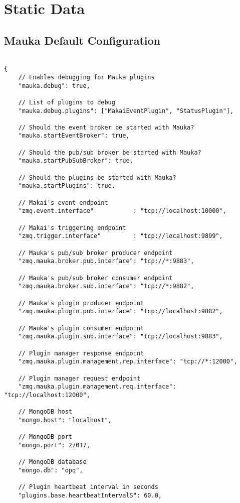 \appendix
\section{Static Data}

\subsection{Mauka Default Configuration}
\label{appendix:MaukaConfig}
\begin{verbatim}

{
	// Enables debugging for Mauka plugins
	"mauka.debug": true,
	
	// List of plugins to debug
	"mauka.debug.plugins": ["MakaiEventPlugin", "StatusPlugin"],
	
	// Should the event broker be started with Mauka?
	"mauka.startEventBroker": true,
	
	// Should the pub/sub broker be started with Mauka?
	"mauka.startPubSubBroker": true,
	
	// Should the plugins be started with Mauka?
	"mauka.startPlugins": true,
	
	// Makai's event endpoint
	"zmq.event.interface"           : "tcp://localhost:10000",
	
	// Makai's triggering endpoint
	"zmq.trigger.interface"         : "tcp://localhost:9899",
	
	// Mauka's pub/sub broker producer endpoint
	"zmq.mauka.broker.pub.interface": "tcp://*:9883",
	
	// Mauka's pub/sub broker consumer endpoint
	"zmq.mauka.broker.sub.interface": "tcp://*:9882",
	
	// Mauka's plugin producer endpoint
	"zmq.mauka.plugin.pub.interface": "tcp://localhost:9882",
	
	// Mauka's plugin consumer endpoint
	"zmq.mauka.plugin.sub.interface": "tcp://localhost:9883",
	
	// Plugin manager response endpoint
	"zmq.mauka.plugin.management.rep.interface": "tcp://*:12000",
	
	// Plugin manager request endpoint
	"zmq.mauka.plugin.management.req.interface": "tcp://localhost:12000",
	
	// MongoDB host
	"mongo.host": "localhost",
	
	// MongoDB port
	"mongo.port": 27017,
	
	// MongoDB database
	"mongo.db": "opq",
	
	// Plugin heartbeat interval in seconds
	"plugins.base.heartbeatIntervalS": 60.0,
	

\end{verbatim}
